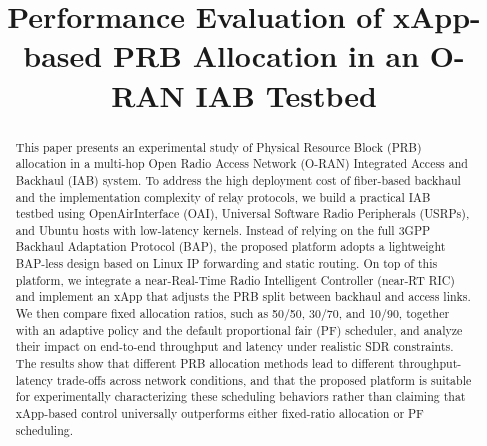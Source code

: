 \documentclass[conference, a4paper]{IEEEtran}
\begin{document}
\title{Performance Evaluation of xApp-based PRB Allocation in an O-RAN IAB Testbed}

\author{
    \and
}

\maketitle

\begin{abstract}
This paper presents an experimental study of Physical Resource Block (PRB) allocation in a multi-hop Open Radio Access Network (O-RAN) Integrated Access and Backhaul (IAB) system. To address the high deployment cost of fiber-based backhaul and the implementation complexity of relay protocols, we build a practical IAB testbed using OpenAirInterface (OAI), Universal Software Radio Peripherals (USRPs), and Ubuntu hosts with low-latency kernels. Instead of relying on the full 3GPP Backhaul Adaptation Protocol (BAP), the proposed platform adopts a lightweight BAP-less design based on Linux IP forwarding and static routing. On top of this platform, we integrate a near-Real-Time Radio Intelligent Controller (near-RT RIC) and implement an xApp that adjusts the PRB split between backhaul and access links. We then compare fixed allocation ratios, such as 50/50, 30/70, and 10/90, together with an adaptive policy and the default proportional fair (PF) scheduler, and analyze their impact on end-to-end throughput and latency under realistic SDR constraints. The results show that different PRB allocation methods lead to different throughput-latency trade-offs across network conditions, and that the proposed platform is suitable for experimentally characterizing these scheduling behaviors rather than claiming that xApp-based control universally outperforms either fixed-ratio allocation or PF scheduling.
\end{abstract}
\end{document}
